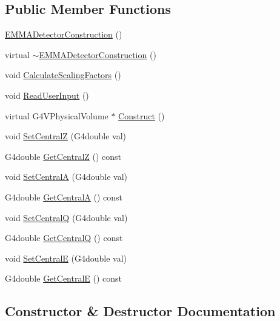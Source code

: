 \subsection*{Public Member Functions}
\begin{DoxyCompactItemize}
\item 
\hyperlink{classEMMADetectorConstruction_aea8756c5ae1d9d45af1391247ec93531}{E\+M\+M\+A\+Detector\+Construction} ()
\item 
virtual \hyperlink{classEMMADetectorConstruction_ac00138c71578472e1551fe62a4e43abb}{$\sim$\+E\+M\+M\+A\+Detector\+Construction} ()
\item 
void \hyperlink{classEMMADetectorConstruction_ab53a71cf6e0b3a3a0cf60095523121e5}{Calculate\+Scaling\+Factors} ()
\item 
void \hyperlink{classEMMADetectorConstruction_aa89a859f846c3321c6fde018b58e4b41}{Read\+User\+Input} ()
\item 
virtual G4\+V\+Physical\+Volume $\ast$ \hyperlink{classEMMADetectorConstruction_a77740cfb7ea659b93907505dc3d7394e}{Construct} ()
\item 
void \hyperlink{classEMMADetectorConstruction_ae64bc38578e7a9bc499bcd848293b716}{Set\+CentralZ} (G4double val)
\item 
G4double \hyperlink{classEMMADetectorConstruction_a321762647df7fa21f2f3f979a26205de}{Get\+CentralZ} () const 
\item 
void \hyperlink{classEMMADetectorConstruction_acebba9a569ca4a6457d2aef838710bc7}{Set\+CentralA} (G4double val)
\item 
G4double \hyperlink{classEMMADetectorConstruction_a14da8a8deaf41f381950e5df8ea71524}{Get\+CentralA} () const 
\item 
void \hyperlink{classEMMADetectorConstruction_a94f020e72696931d02ffbd2f1ce33464}{Set\+CentralQ} (G4double val)
\item 
G4double \hyperlink{classEMMADetectorConstruction_a232e53deb522c426f78037e65394ead8}{Get\+CentralQ} () const 
\item 
void \hyperlink{classEMMADetectorConstruction_ad12b32e6c40568ab4c53b23c5f6f2a33}{Set\+CentralE} (G4double val)
\item 
G4double \hyperlink{classEMMADetectorConstruction_af339acae41eb00db293badf67ede3229}{Get\+CentralE} () const 
\end{DoxyCompactItemize}


\subsection{Constructor \& Destructor Documentation}
